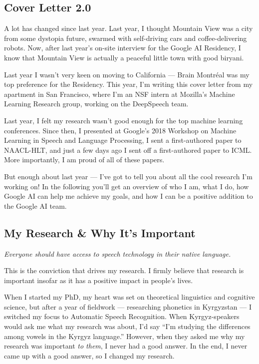 \documentclass[12pt,a4paper]{article}
\begin{document}
\subsection*{Cover Letter 2.0}


A lot has changed since last year. Last year, I thought Mountain View was a city from some dystopia future, swarmed with self-driving cars and coffee-delivering robots. Now, after last year's on-site interview for the Google AI Residency, I know that Mountain View is actually a peaceful little town with good biryani.

Last year I wasn't very keen on moving to California --- Brain Montr\'eal was my top preference for the Residency. This year, I'm writing this cover letter from my apartment in San Francisco, where I'm an NSF intern at Mozilla's Machine Learning Research group, working on the DeepSpeech team.

Last year, I felt my research wasn't good enough for the top machine learning conferences. Since then, I presented at Google's 2018 Workshop on Machine Learning in Speech and Language Processing, I sent a first-authored paper to NAACL-HLT, and just a few days ago I sent off a first-authored paper to ICML. More importantly, I am proud of all of these papers.

But enough about last year --- I've got to tell you about all the cool research I'm working on! In the following you'll get an overview of who I am, what I do, how Google AI can help me achieve my goals, and how I can be a positive addition to the Google AI team.




\subsection*{My Research \& Why It's Important}

\begin{center}
\textit{Everyone should have access to speech technology in their native language.}
\end{center}

This is the conviction that drives my research. I firmly believe that research is important insofar as it has a positive impact in people's lives.

When I started my PhD, my heart was set on theoretical linguistics and cognitive science, but after a year of fieldwork --- researching phonetics in Kyrgyzstan --- I switched my focus to Automatic Speech Recognition. When Kyrgyz-speakers would ask me what my research was about, I'd say ``I'm studying the differences among vowels in the Kyrgyz language.'' However, when they asked me why my research was important \textit{to them}, I never had a good answer. In the end, I never came up with a good answer, so I changed my research.
\end{document}

